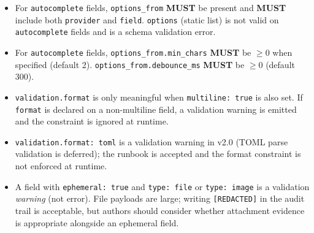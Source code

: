 \begin{itemize}
        silently ignored when \texttt{validation.pattern} is absent
        (warning, not error).
  \item For \texttt{autocomplete} fields, \texttt{options\_from} \textbf{MUST}
        be present and \textbf{MUST} include both \texttt{provider} and
        \texttt{field}.  \texttt{options} (static list) is not valid on
        \texttt{autocomplete} fields and is a schema validation error.
  \item For \texttt{autocomplete} fields, \texttt{options\_from.min\_chars}
        \textbf{MUST} be $\geq 0$ when specified (default 2).
        \texttt{options\_from.debounce\_ms} \textbf{MUST} be $\geq 0$ (default 300).
  \item \texttt{validation.format} is only meaningful when \texttt{multiline:
        true} is also set.  If \texttt{format} is declared on a
        non-multiline field, a validation warning is emitted and the
        constraint is ignored at runtime.
  \item \texttt{validation.format: toml} is a validation warning in v2.0
        (TOML parse validation is deferred); the runbook is accepted and the
        format constraint is not enforced at runtime.
  \item A field with \texttt{ephemeral: true} and \texttt{type: file} or
        \texttt{type: image} is a validation \emph{warning} (not error).
        File payloads are large; writing \texttt{[REDACTED]} in the audit
        trail is acceptable, but authors should consider whether attachment
        evidence is appropriate alongside an ephemeral field.
\end{itemize}

